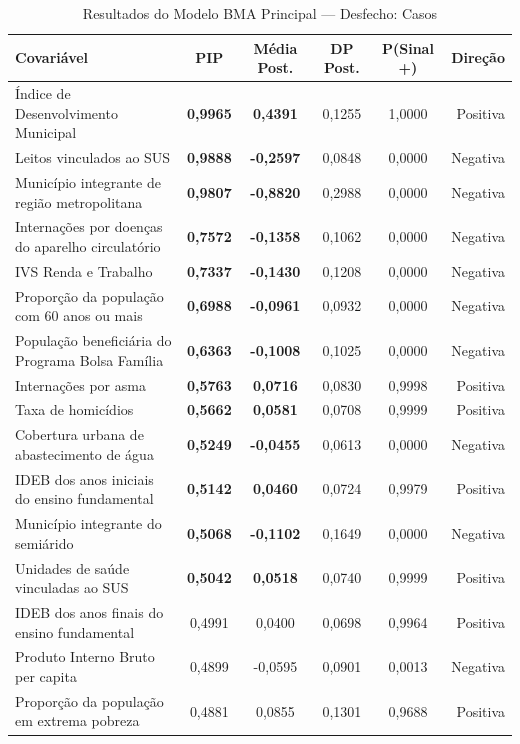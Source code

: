 \begin{table}[htbp]
\centering
\footnotesize
\caption{Resultados do Modelo BMA Principal — Desfecho: Casos}
\label{tab:bma_casos}
\begin{tabular}{lccccr}
\toprule
\textbf{Covariável} & \textbf{PIP} & \textbf{Média Post.} & \textbf{DP Post.} & \textbf{P(Sinal +)} & \textbf{Direção} \\
\midrule
Índice de Desenvolvimento Municipal & \textbf{0,9965} & \textbf{0,4391} & 0,1255 & 1,0000 & Positiva \\
Leitos vinculados ao SUS & \textbf{0,9888} & \textbf{-0,2597} & 0,0848 & 0,0000 & Negativa \\
Município integrante de região metropolitana & \textbf{0,9807} & \textbf{-0,8820} & 0,2988 & 0,0000 & Negativa \\
Internações por doenças do aparelho circulatório & \textbf{0,7572} & \textbf{-0,1358} & 0,1062 & 0,0000 & Negativa \\
IVS Renda e Trabalho & \textbf{0,7337} & \textbf{-0,1430} & 0,1208 & 0,0000 & Negativa \\
Proporção da população com 60 anos ou mais & \textbf{0,6988} & \textbf{-0,0961} & 0,0932 & 0,0000 & Negativa \\
População beneficiária do Programa Bolsa Família & \textbf{0,6363} & \textbf{-0,1008} & 0,1025 & 0,0000 & Negativa \\
Internações por asma & \textbf{0,5763} & \textbf{0,0716} & 0,0830 & 0,9998 & Positiva \\
Taxa de homicídios & \textbf{0,5662} & \textbf{0,0581} & 0,0708 & 0,9999 & Positiva \\
Cobertura urbana de abastecimento de água & \textbf{0,5249} & \textbf{-0,0455} & 0,0613 & 0,0000 & Negativa \\
IDEB dos anos iniciais do ensino fundamental & \textbf{0,5142} & \textbf{0,0460} & 0,0724 & 0,9979 & Positiva \\
Município integrante do semiárido & \textbf{0,5068} & \textbf{-0,1102} & 0,1649 & 0,0000 & Negativa \\
Unidades de saúde vinculadas ao SUS & \textbf{0,5042} & \textbf{0,0518} & 0,0740 & 0,9999 & Positiva \\
IDEB dos anos finais do ensino fundamental & 0,4991 & 0,0400 & 0,0698 & 0,9964 & Positiva \\
Produto Interno Bruto per capita & 0,4899 & -0,0595 & 0,0901 & 0,0013 & Negativa \\
Proporção da população em extrema pobreza & 0,4881 & 0,0855 & 0,1301 & 0,9688 & Positiva \\

\end{tabular}
\end{table}
